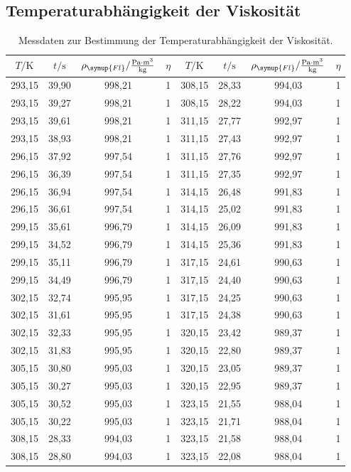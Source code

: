 \subsection{Temperaturabhängigkeit der Viskosität}
\label{sec:TempVisk}

\begin{table}
  \centering
  \caption{Messdaten zur Bestimmung der Temperaturabhängigkeit der Viskosität.}
  \label{tab:Temp}
  \begin{tabular}{c c c c | c c c c}
    \toprule
    $T/\unit{\kelvin}$ & $t/\unit{\second}$ & $\rho_{\symup{Fl}}/\frac{\unit{\pascal}\cdot\unit{\meter^3}}{\unit{\kilo\gram}}$ & $\eta$ & $T/\unit{\kelvin}$ & $t/\unit{\second}$ & $\rho_{\symup{Fl}}/\frac{\unit{\pascal}\cdot\unit{\meter^3}}{\unit{\kilo\gram}}$ & $\eta$ \\
    \midrule
    293,15 & 39,90 & 998,21 & 1 & 308,15 & 28,33 & 994,03 & 1 \\
    293,15 & 39,27 & 998,21 & 1 & 308,15 & 28,22 & 994,03 & 1 \\
    293,15 & 39,61 & 998,21 & 1 & 311,15 & 27,77 & 992,97 & 1 \\
    293,15 & 38,93 & 998,21 & 1 & 311,15 & 27,43 & 992,97 & 1 \\
    296,15 & 37,92 & 997,54 & 1 & 311,15 & 27,76 & 992,97 & 1 \\
    296,15 & 36,39 & 997,54 & 1 & 311,15 & 27,35 & 992,97 & 1 \\
    296,15 & 36,94 & 997,54 & 1 & 314,15 & 26,48 & 991,83 & 1 \\
    296,15 & 36,61 & 997,54 & 1 & 314,15 & 25,02 & 991,83 & 1 \\
    299,15 & 35,61 & 996,79 & 1 & 314,15 & 26,09 & 991,83 & 1 \\
    299,15 & 34,52 & 996,79 & 1 & 314,15 & 25,36 & 991,83 & 1 \\
    299,15 & 35,11 & 996,79 & 1 & 317,15 & 24,61 & 990,63 & 1 \\
    299,15 & 34,49 & 996,79 & 1 & 317,15 & 24,40 & 990,63 & 1 \\
    302,15 & 32,74 & 995,95 & 1 & 317,15 & 24,25 & 990,63 & 1 \\
    302,15 & 31,61 & 995,95 & 1 & 317,15 & 24,38 & 990,63 & 1 \\
    302,15 & 32,33 & 995,95 & 1 & 320,15 & 23,42 & 989,37 & 1 \\
    302,15 & 31,83 & 995,95 & 1 & 320,15 & 22,80 & 989,37 & 1 \\
    305,15 & 30,80 & 995,03 & 1 & 320,15 & 23,05 & 989,37 & 1 \\
    305,15 & 30,27 & 995,03 & 1 & 320,15 & 22,95 & 989,37 & 1 \\
    305,15 & 30,52 & 995,03 & 1 & 323,15 & 21,55 & 988,04 & 1 \\
    305,15 & 30,22 & 995,03 & 1 & 323,15 & 21,71 & 988,04 & 1 \\
    308,15 & 28,33 & 994,03 & 1 & 323,15 & 21,58 & 988,04 & 1 \\
    308,15 & 28,80 & 994,03 & 1 & 323,15 & 22,08 & 988,04 & 1 \\
    \bottomrule
  \end{tabular}
\end{table}